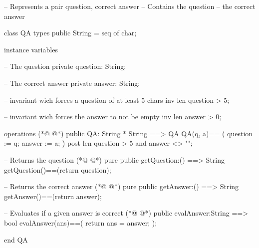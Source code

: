 \begin{vdmpp}[breaklines=true]
-- Represents a pair question, correct answer
-- Contains the question
--      the correct answer

class QA
 types 
   public String = seq of char;
   
  instance variables
  
   -- The question
   private question: String;
   
   -- The correct answer
   private answer: String;
   
   -- invariant wich forces a question of at least 5 chars
   inv len question > 5;
   
   -- invariant wich forces the answer to not be empty
   inv len answer > 0;
  
  operations
(*@
\label{QA:24}
@*)
   public QA: String * String ==> QA
   QA(q, a)== 
   (
     question := q;
     answer := a;
   )
   post len question > 5 and answer <> "";
   
   -- Returns the question
(*@
\label{getQuestion:33}
@*)
   pure public getQuestion:() ==> String
    getQuestion()==(return question); 
    
    -- Returns the correct answer
(*@
\label{getAnswer:37}
@*)
    pure public getAnswer:() ==> String
    getAnswer()==(return answer); 
   
   -- Evaluates if a given answer is correct
(*@
\label{evalAnswer:41}
@*)
   public evalAnswer:String ==> bool
    evalAnswer(ans)==(
     return ans = answer;
    ); 

end QA
\end{vdmpp}
